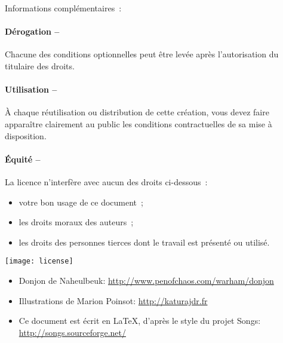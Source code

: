 \begin{lblock}{Informations complémentaires~:}

  \hspace{0.4cm}
  \parbox{15cm}{
    \paragraph{Dérogation --}
    Chacune des conditions optionnelles peut être levée après
    l'autorisation du titulaire des droits.

    \paragraph{Utilisation --}
    À chaque réutilisation ou distribution de cette création, vous
    devez faire apparaître clairement au public les conditions
    contractuelles de sa mise à disposition.

    \paragraph{Équité --}
    La licence n'interfère avec aucun des droits ci-dessous~:
    \begin{itemize}
    \item votre bon usage de ce document~;
    \item les droits moraux des auteurs~;
    \item les droits des personnes tierces dont le travail est
      présenté ou utilisé.
    \end{itemize}
  }

  \begin{center}
    \texttt{[image: license]}
  \end{center}

\end{lblock}
\begin{itemize}
\item Donjon de Naheulbeuk:
  \url{http://www.penofchaos.com/warham/donjon}
\item Illustrations de Marion Poinsot: \url{http://katurajdr.fr}
\item Ce document est écrit en \LaTeX, d'après le style du projet
  Songs: \url{http://songs.sourceforge.net/}
\end{itemize}
